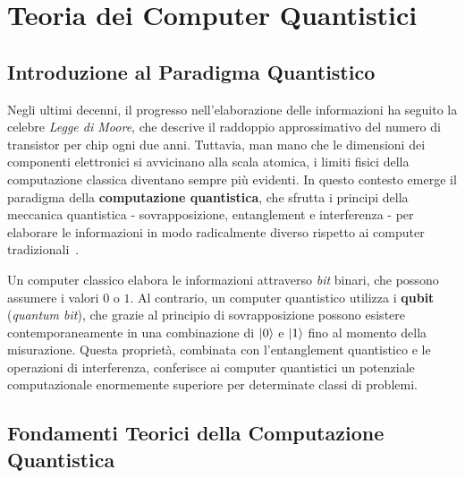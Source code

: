 \chapter{Teoria dei Computer Quantistici}
\label{chap:quantum}

\section{Introduzione al Paradigma Quantistico}
\label{sec:intro}

Negli ultimi decenni, il progresso nell'elaborazione delle informazioni ha
seguito la celebre \textit{Legge di Moore}, che descrive il raddoppio
approssimativo del numero di transistor per chip ogni due anni. Tuttavia,
man mano che le dimensioni dei componenti elettronici si avvicinano alla scala
atomica, i limiti fisici della computazione classica diventano sempre più
evidenti. In questo contesto emerge il paradigma della \textbf{computazione
quantistica}, che sfrutta i principi della meccanica quantistica -
sovrapposizione, entanglement e interferenza - per elaborare le informazioni
in modo radicalmente diverso rispetto ai computer tradizionali~\cite{nielsen2010quantum}.

Un computer classico elabora le informazioni attraverso \textit{bit} binari, che
possono assumere i valori $0$ o $1$. Al contrario, un computer quantistico
utilizza i \textbf{qubit} (\textit{quantum bit}), che grazie al principio di
sovrapposizione possono esistere contemporaneamente in una combinazione di
$\ket{0}$ e $\ket{1}$ fino al momento della misurazione. Questa proprietà,
combinata con l'entanglement quantistico e le operazioni di interferenza,
conferisce ai computer quantistici un potenziale computazionale enormemente
superiore per determinate classi di problemi.

\section{Fondamenti Teorici della Computazione Quantistica}
\label{sec:fondamenti}

